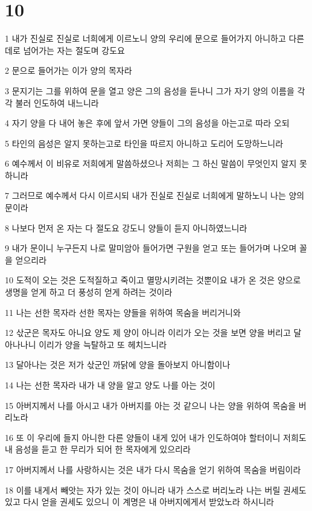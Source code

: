 \chapter{10}

\par 1 내가 진실로 진실로 너희에게 이르노니 양의 우리에 문으로 들어가지 아니하고 다른데로 넘어가는 자는 절도며 강도요
\par 2 문으로 들어가는 이가 양의 목자라
\par 3 문지기는 그를 위하여 문을 열고 양은 그의 음성을 듣나니 그가 자기 양의 이름을 각각 불러 인도하여 내느니라
\par 4 자기 양을 다 내어 놓은 후에 앞서 가면 양들이 그의 음성을 아는고로 따라 오되
\par 5 타인의 음성은 알지 못하는고로 타인을 따르지 아니하고 도리어 도망하느니라
\par 6 예수께서 이 비유로 저희에게 말씀하셨으나 저희는 그 하신 말씀이 무엇인지 알지 못하니라
\par 7 그러므로 예수께서 다시 이르시되 내가 진실로 진실로 너희에게 말하노니 나는 양의 문이라
\par 8 나보다 먼저 온 자는 다 절도요 강도니 양들이 듣지 아니하였느니라
\par 9 내가 문이니 누구든지 나로 말미암아 들어가면 구원을 얻고 또는 들어가며 나오며 꼴을 얻으리라
\par 10 도적이 오는 것은 도적질하고 죽이고 멸망시키려는 것뿐이요 내가 온 것은 양으로 생명을 얻게 하고 더 풍성히 얻게 하려는 것이라
\par 11 나는 선한 목자라 선한 목자는 양들을 위하여 목숨을 버리거니와
\par 12 삯군은 목자도 아니요 양도 제 양이 아니라 이리가 오는 것을 보면 양을 버리고 달아나나니 이리가 양을 늑탈하고 또 헤치느니라
\par 13 달아나는 것은 저가 삯군인 까닭에 양을 돌아보지 아니함이나
\par 14 나는 선한 목자라 내가 내 양을 알고 양도 나를 아는 것이
\par 15 아버지께서 나를 아시고 내가 아버지를 아는 것 같으니 나는 양을 위하여 목숨을 버리노라
\par 16 또 이 우리에 들지 아니한 다른 양들이 내게 있어 내가 인도하여야 할터이니 저희도 내 음성을 듣고 한 무리가 되어 한 목자에게 있으리라
\par 17 아버지께서 나를 사랑하시는 것은 내가 다시 목숨을 얻기 위하여 목숨을 버림이라
\par 18 이를 내게서 빼앗는 자가 있는 것이 아니라 내가 스스로 버리노라 나는 버릴 권세도 있고 다시 얻을 권세도 있으니 이 계명은 내 아버지에게서 받았노라 하시니라
